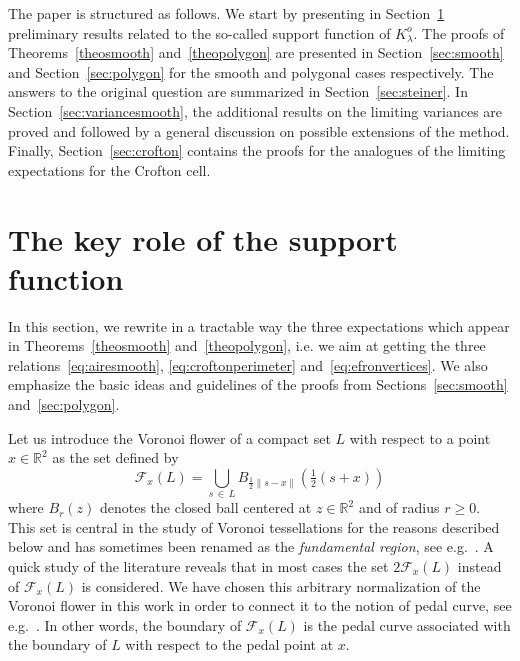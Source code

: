 \documentclass[AHL,Unicode,longabstracts,published]{cedram}
\newcommand{\cF}{\mathcal{F}}
\newcommand{\R}{\mathbb{R}}
\newcommand{\pass}{\vspace{0.3cm}\noindent}
\newcommand{\noi}{\noindent}
\newcommand{\R}{\mathbb{R}}
\begin{document}
The paper is structured as follows. We start by presenting in Section~\ref{sec:keytools} preliminary results related to the so-called support function of $K_{\lambda}^o$. The proofs of Theorems~\ref{theosmooth} and~\ref{theopolygon} are presented in Section~\ref{sec:smooth} and Section~\ref{sec:polygon} for the smooth and polygonal cases respectively. The answers to the original question are summarized in Section~\ref{sec:steiner}. In Section~\ref{sec:variancesmooth}, the additional results on the limiting variances are proved and followed by a general discussion on possible extensions of the method. Finally, Section~\ref{sec:crofton} contains the proofs for the analogues of the limiting expectations for the Crofton cell.



\section{The key role of the support function}\label{sec:keytools}

In this section, we rewrite in a tractable way the three expectations which appear in Theorems~\ref{theosmooth} and~\ref{theopolygon}, i.e. we aim at getting the three relations~\eqref{eq:airesmooth}, \eqref{eq:croftonperimeter} and~\eqref{eq:efronvertices}. We also emphasize the basic ideas and guidelines of the proofs from Sections~\ref{sec:smooth} and~\ref{sec:polygon}.

Let us introduce the Voronoi flower of a compact set $L$ with respect to a point $x\in\R^2$ as the set defined by
\begin{equation}\label{def:vorflow}
\cF_x(L)= \bigcup_{s\,\in\,L} B_{\frac1{2}\|s-x\|}\left(\tfrac1{2}(s+x)\right)
\end{equation}
where $B_r(z)$ denotes the closed ball centered at $z\in \R^2$ and of radius $r\ge 0$. This set is central in the study of Voronoi tessellations for the reasons described below and has sometimes been renamed as the \emph{fundamental region}, see e.g.~\cite{zuyev}. A quick study of the literature reveals that in most cases the set $2\cF_x(L)$ instead of $\cF_x(L)$ is considered. We have chosen this arbitrary normalization of the Voronoi flower in this work in order to connect it to the notion of pedal curve, see e.g.~\cite[Chapter~11]{zwikker}. In other words, the boundary of $\cF_x(L)$ is the pedal curve associated with the boundary of $L$ with respect to the pedal point at $x$.
\end{document}
